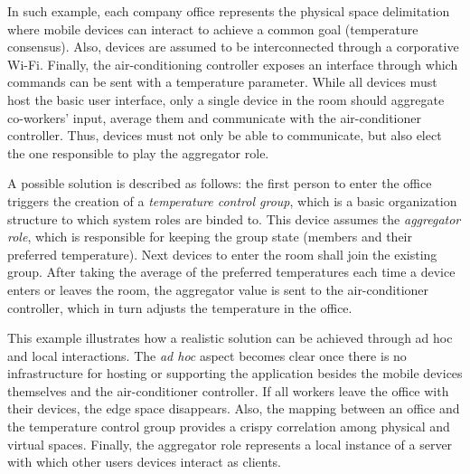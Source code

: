 In such example, each company office represents the physical space delimitation where mobile devices can interact to achieve a common goal (temperature consensus). Also, devices are assumed to be interconnected through a corporative Wi-Fi. Finally, the air-conditioning controller exposes an interface through which commands can be sent with a temperature parameter. While all devices must host the basic user interface, only a single device in the room should aggregate co-workers' input, average them and communicate with the air-conditioner controller. Thus, devices must not only be able to communicate, but also elect the one responsible to play the aggregator role.

A possible solution is described as follows: the first person to enter the office triggers the creation of a \textit{temperature control group}, which is a basic organization structure to which system roles are binded to. This device assumes the \textit{aggregator role}, which is responsible for keeping the group state (members and their preferred temperature). Next devices to enter the room shall join the existing group. After taking the average of the preferred temperatures each time a device enters or leaves the room, the aggregator value is sent to the air-conditioner controller, which in turn adjusts the temperature in the office. 

This example illustrates how a realistic solution can be achieved through ad hoc and local interactions. The \textit{ad hoc} aspect becomes clear once there is no infrastructure for hosting or supporting the application besides the mobile devices themselves and the air-conditioner controller. If all workers leave the office with their devices, the edge space disappears. Also, the mapping between an office and the temperature control group provides a crispy correlation among physical and virtual spaces. Finally, the aggregator role represents a local instance of a server with which other users devices interact as clients. 


